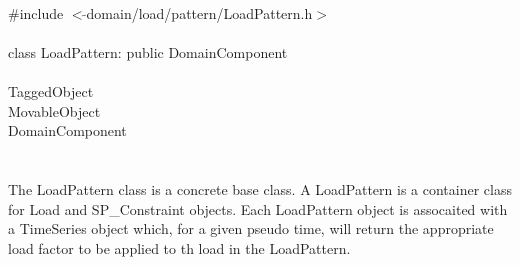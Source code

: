 
   \\
\indent \#include $<\tilde{ }$domain/load/pattern/LoadPattern.h$>$  \\

  \\
\indent class LoadPattern: public DomainComponent  \\

 \\
\indent TaggedObject \\
\indent MovableObject \\
\indent\indent DomainComponent \\
\indent\indent{} \\

 \\ 
\indent The LoadPattern class is a concrete base class. A
LoadPattern is a container class for Load and SP\_Constraint
objects. Each LoadPattern object is assocaited with a TimeSeries
object which, for a given pseudo time, will return the appropriate
load factor to be applied to th load in the LoadPattern. \\

